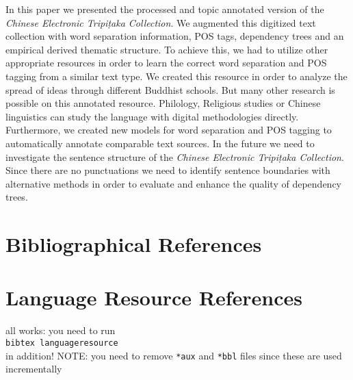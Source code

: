 \documentclass[a4paper,10pt]{article}
\newcommand{\TODO}[1]{\begingroup\color{red}#1\endgroup}
\begin{document}
In this paper we presented the processed and topic annotated version of the \textit{Chinese Electronic Tripi{\d{t}}aka
  Collection}. We augmented this digitized text collection with word separation information, POS tags, dependency trees and an empirical derived thematic structure. To achieve this, we had to utilize other appropriate resources in order to learn the correct word separation and POS tagging from a similar text type. We created this resource in order to analyze the spread of ideas through different Buddhist schools. But many other research is possible on this annotated resource. Philology, Religious studies or Chinese linguistics can study the language with digital methodologies directly. Furthermore, we created new models for word separation and POS tagging  to automatically annotate comparable text sources. In the future we need to investigate the sentence structure of the \textit{Chinese Electronic Tripi{\d{t}}aka
  Collection}. Since there are no punctuations we need to identify sentence boundaries with alternative methods in order to evaluate and enhance the quality of dependency trees.

\section{Bibliographical References}
\label{main:ref}





\section{Language Resource References}
\label{lr:ref}

\TODO{all works: you need to run\\
\texttt{bibtex languageresource}\\
 in addition! NOTE: you need to remove 
\texttt{*aux} and \texttt{*bbl} files since these are used incrementally }

\end{document}
